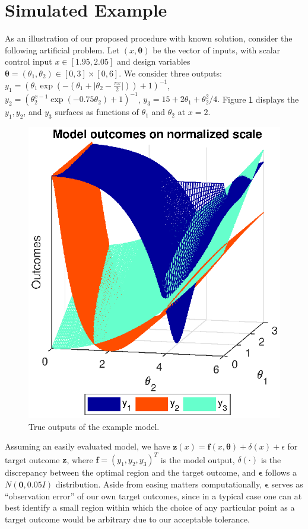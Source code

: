 \documentclass[12pt]{article}
\begin{document}
\section{Simulated Example}\label{example}
As an illustration of our proposed procedure with known solution, consider the following artificial problem. 
%
Let $(x,\boldsymbol \theta)$ be the vector of inputs, with scalar control input $x\in[1.95,2.05]$ and design variables $\boldsymbol \theta = (\theta_1,\theta_2)\in[0,3]\times[0,6]$.
%
We consider three outputs:
%
$
y_1 = \left(\theta_1 \exp\left(-\left(\theta_1 + \lvert \theta_2-\frac{\pi x}2\rvert \right)\right)+1\right)^{-1}$, 
$
y_2 = \left(\theta_2^{x-1} \exp\left(-0.75 \theta_2\right) + 1 \right)^{-1}
$, 
$
y_3 = 15 + 2 \theta_1 + {\theta_2^2}/4.
$
%
Figure \ref{fig:toy_sim_outputs} displays the $y_1, y_2$, and $y_3$ surfaces as functions of $\theta_1$ and $\theta_2$ at $x = 2$.
%
\begin{figure}
\centering
\includegraphics[scale=.8]{FIG_toy_sim_model_outputs.eps}
\caption{True outputs of the example model.}
\label{fig:toy_sim_outputs}
\end{figure}
%
Assuming an easily evaluated model, we have
%
$
\mathbf z(x) = \mathbf f(x,\boldsymbol \theta) + \delta(x) + \epsilon
$
%
for target outcome $\mathbf z$, where $\mathbf f = (y_1,y_2,y_3)^T$ is the model output, $\delta(\cdot)$ is the discrepancy between the optimal region and the target outcome, and $\boldsymbol \epsilon$ follows a $N(\mathbf 0,0.05I)$ distribution. 
%
Aside from easing matters computationally, $\boldsymbol \epsilon$ serves as ``observation error'' of our own target outcomes, since in a typical case one can at best identify a small region within which the choice of any particular point as a target outcome would be arbitrary due to our acceptable tolerance.
%
\end{document}
